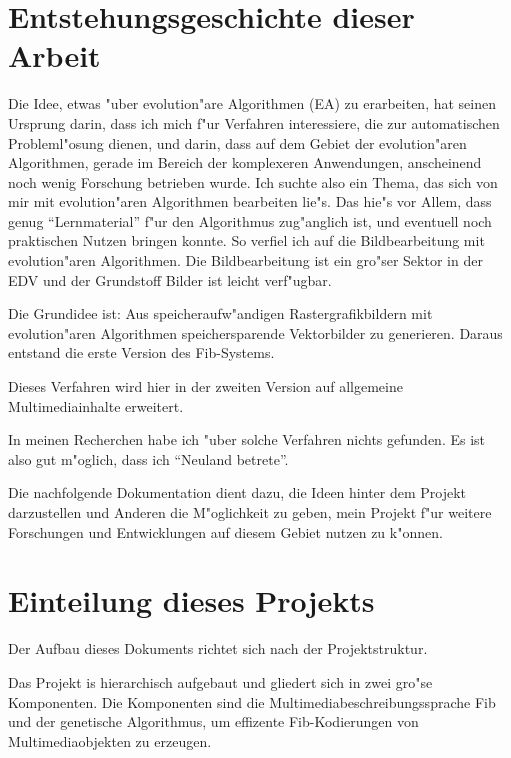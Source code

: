\documentclass[11pt,a4paper]{article}
\begin{document}
\section{Entstehungsgeschichte dieser Arbeit}

Die Idee, etwas "uber evolution"are Algorithmen (EA) zu erarbeiten, hat seinen Ursprung darin, dass ich mich f"ur Verfahren interessiere, die zur automatischen Probleml"osung dienen, und darin, dass auf dem Gebiet der evolution"aren Algorithmen, gerade im Bereich der komplexeren Anwendungen, anscheinend noch wenig Forschung betrieben wurde. Ich suchte also ein Thema, das sich von mir mit evolution"aren Algorithmen bearbeiten lie"s. Das hie"s vor Allem, dass genug ``Lernmaterial'' f"ur den Algorithmus zug"anglich ist, und eventuell noch praktischen Nutzen bringen konnte.
So verfiel ich auf die Bildbearbeitung mit evolution"aren Algorithmen. Die Bildbearbeitung ist ein gro"ser Sektor in der EDV und der Grundstoff Bilder ist leicht verf"ugbar.

Die Grundidee ist: Aus speicheraufw"andigen Rastergrafikbildern mit evolution"aren Algorithmen speichersparende Vektorbilder zu generieren. Daraus entstand die erste Version des Fib-Systems.

Dieses Verfahren wird hier in der zweiten Version auf allgemeine Multimediainhalte erweitert.

In meinen Recherchen habe ich "uber solche Verfahren nichts gefunden. Es ist also gut m"oglich, dass ich ``Neuland betrete''.

Die nachfolgende Dokumentation dient dazu, die Ideen hinter dem Projekt darzustellen und Anderen die M"oglichkeit zu geben, mein Projekt f"ur weitere Forschungen und Entwicklungen auf diesem Gebiet nutzen zu k"onnen.


\section{Einteilung dieses Projekts}

Der Aufbau dieses Dokuments richtet sich nach der Projektstruktur.

Das Projekt is hierarchisch aufgebaut und gliedert sich in zwei gro"se Komponenten.
Die Komponenten sind die Multimediabeschreibungssprache Fib und der genetische Algorithmus, um effizente Fib-Kodierungen von Multimediaobjekten zu erzeugen.
\end{document}
